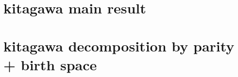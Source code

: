 \documentclass{article}
\begin{document}
\section{kitagawa main result}
\begin{table}[H]
    \centering
    \normalsize %
    \label{tab:sumstat}
    \caption{: Main result, kitagawa decomposition}
    {}
\end{table}






\section{kitagawa decomposition by parity + birth space}




\begin{table}[H]
    \centering
    \footnotesize %
    \caption{: Dalit fwd decomposition}
    \label{tab:sumstat}
\end{table}

\begin{table}[H]
    \centering
    \footnotesize %
    \caption{: Adivasi fwd decomposition}
    \label{tab:sumstat}
\end{table}


\begin{table}[H]
    \centering
    \footnotesize %
    \caption{: Muslim fwd decomposition}
    \label{tab:sumstat}
\end{table}
\end{document}
